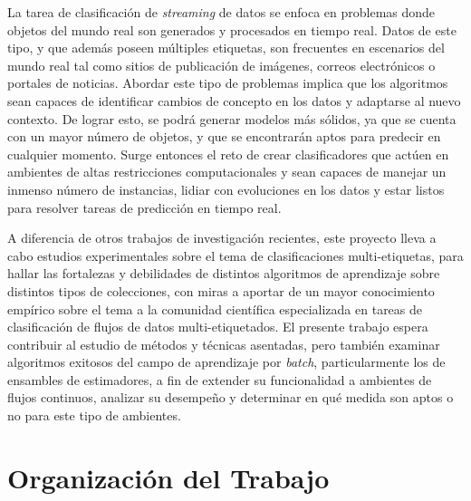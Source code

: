 La tarea de clasificación de \textit{streaming} de datos se enfoca en problemas
donde objetos del mundo real son generados y procesados en tiempo real. Datos de
este tipo, y que además poseen múltiples etiquetas, son frecuentes en escenarios
del mundo real tal como sitios de publicación de imágenes, correos electrónicos
o portales de noticias. Abordar este tipo de problemas implica que los
algoritmos sean capaces de identificar cambios de concepto en los datos y
adaptarse al nuevo contexto. De lograr esto, se podrá generar modelos más
sólidos, ya que se cuenta con un mayor número de objetos, y que se encontrarán
aptos para predecir en cualquier momento. Surge entonces el reto de crear
clasificadores que actúen en ambientes de altas restricciones computacionales y
sean capaces de manejar un inmenso número de instancias, lidiar con evoluciones
en los datos y estar listos para resolver tareas de predicción en tiempo real.

A diferencia de otros trabajos de investigación recientes, este proyecto lleva a
cabo estudios experimentales sobre el tema de clasificaciones multi-etiquetas,
para hallar las fortalezas y debilidades de distintos algoritmos de aprendizaje
sobre distintos tipos de colecciones, con miras a aportar de un mayor
conocimiento empírico sobre el tema a la comunidad científica especializada en
tareas de clasificación de flujos de datos multi-etiquetados. El presente
trabajo espera contribuir al estudio de métodos y técnicas asentadas, pero
también examinar algoritmos exitosos del campo de aprendizaje por
\textit{batch}, particularmente los de ensambles de estimadores, a fin de
extender su funcionalidad a ambientes de flujos continuos, analizar su desempeño
y determinar en qué medida son aptos o no para este tipo de ambientes.  


\section{Organización del Trabajo} 

